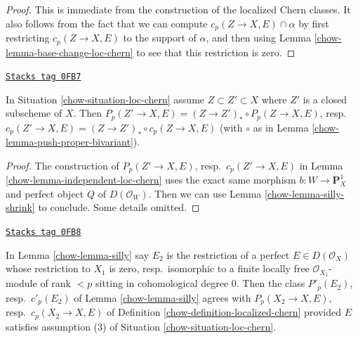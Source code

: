 \begin{proof}

This is immediate from the construction of the localized Chern classes.
It also follows from the fact that we can compute
$c_p(Z \to X, E) \cap \alpha$ by first restricting $c_p(Z \to X, E)$ to
the support of $\alpha$, and then using
Lemma \ref{chow-lemma-base-change-loc-chern}
to see that this restriction is zero.
\end{proof}

\begin{lemma}
\label{chow-lemma-loc-chern-shrink-Z}
\href{https://stacks.math.columbia.edu/tag/0FB7}{\texttt{Stacks tag 0FB7}}

In Situation \ref{chow-situation-loc-chern}
assume $Z \subset Z' \subset X$ where $Z'$ is a closed subscheme of $X$.
Then
$P_p(Z' \to X, E) = (Z \to Z')_* \circ P_p(Z \to X, E)$,
resp.\ $c_p(Z' \to X, E) = (Z \to Z')_* \circ c_p(Z \to X, E)$
(with $\circ$ as in Lemma \ref{chow-lemma-push-proper-bivariant}).
\end{lemma}

\begin{proof}

The construction of $P_p(Z' \to X, E)$,
resp.\ $c_p(Z' \to X, E)$ in Lemma \ref{chow-lemma-independent-loc-chern}
uses the exact same morphism
$b : W \to \mathbf{P}^1_X$ and perfect object $Q$ of $D(\mathcal{O}_W)$.
Then we can use Lemma \ref{chow-lemma-silly-shrink} to conclude.
Some details omitted.
\end{proof}

\begin{lemma}
\label{chow-lemma-loc-chern-agree}
\href{https://stacks.math.columbia.edu/tag/0FB8}{\texttt{Stacks tag 0FB8}}

In Lemma \ref{chow-lemma-silly} say $E_2$ is the restriction of a perfect
$E \in D(\mathcal{O}_X)$ whose restriction to $X_1$ is zero,
resp.\ isomorphic to a finite locally free $\mathcal{O}_{X_1}$-module
of rank $< p$ sitting in cohomological degree $0$. Then the class
$P'_p(E_2)$, resp.\ $c'_p(E_2)$ of Lemma \ref{chow-lemma-silly} agrees with
$P_p(X_2 \to X, E)$, resp.\ $c_p(X_2 \to X, E)$ of
Definition \ref{chow-definition-localized-chern} provided $E$ satisfies
assumption (3) of Situation \ref{chow-situation-loc-chern}.
\end{lemma}


